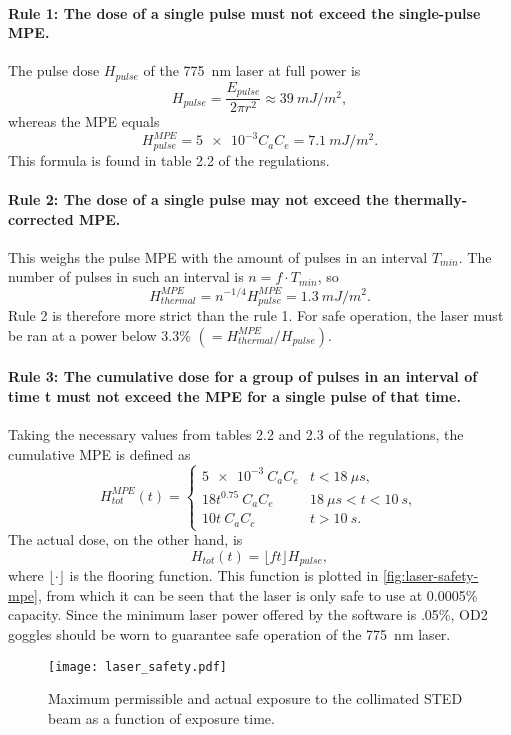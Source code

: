 \paragraph{Rule 1: The dose of a single pulse must not exceed the single-pulse MPE.} The pulse dose $ H_\mathit{pulse} $ of the 775~nm laser at full power is
\begin{equation}
	H_\mathit{pulse} = \frac{E_\mathit{pulse}}{2\pi r^2} \approx \SI{39}{mJ/m^2},
\end{equation}
whereas the MPE equals
\begin{equation}
	H_\mathit{pulse}^\mathit{MPE} = \num{5e-3} C_a C_e = \SI{7.1}{mJ/m^2}.
\end{equation}
This formula is found in table 2.2 of the regulations.

\paragraph{Rule 2: The dose of a single pulse may not exceed the thermally-corrected MPE.} This weighs the pulse MPE with the amount of pulses in an interval $ T_\mathit{min} $. The number of pulses in such an interval is $ n = f\cdot T_\mathit{min} $, so
\begin{equation}
	H_\mathit{thermal}^\mathit{MPE} =  n^{-1/4} H_\mathit{pulse}^\mathit{MPE} = \SI{1.3}{mJ/m^2}.
\end{equation}
Rule 2 is therefore more strict than the rule 1. For safe operation, the laser must be ran at a power below 3.3\% $ (=H^\mathit{MPE}_\mathit{thermal} / H_\mathit{pulse}) $.

\paragraph{Rule 3: The cumulative dose for a group of pulses in an interval of time t must not exceed the MPE for a single pulse of that time.} Taking the necessary values from tables 2.2 and 2.3 of the regulations, the cumulative MPE is defined as
\begin{equation}
	H_\mathit{tot}^\mathit{MPE}(t) = \left\{\begin{array}{rl}
		\num{5e-3} \:C_a C_e &  t<\SI{18}{\mu s,} \\
		18 t^{0.75} \:C_a C_e &  \SI{18}{\mu s} < t < \SI{10}{s}, \\
		10 t\:C_a C_c  &t> \SI{10}{s}.
	\end{array}\right.
\end{equation}
The actual dose, on the other hand, is
\begin{equation}
	H_\mathit{tot}(t) = \lfloor ft \rfloor H_\mathit{pulse},
\end{equation}
where $ \lfloor \cdot \rfloor$ is the flooring function. This function is plotted in \autoref{fig:laser-safety-mpe}, from which it can be seen that the laser is only safe to use at 0.0005\% capacity. Since the minimum laser power offered by the software is .05\%, OD2 goggles should be worn to guarantee safe operation of the 775~nm laser.

\begin{figure}
	\centering
	\texttt{[image: laser\_safety.pdf]}
	\caption{Maximum permissible  and actual exposure to the collimated STED beam as a function of exposure time.}
	\label{fig:laser-safety-mpe}
\end{figure}